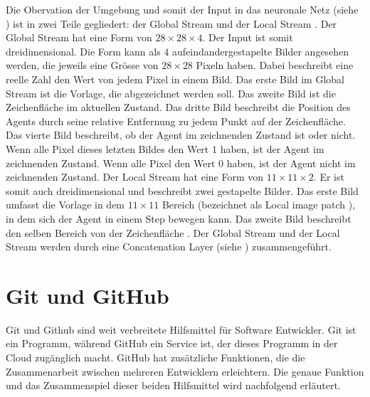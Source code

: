 Die Obervation der Umgebung und somit der Input in das neuronale Netz (siehe
) ist in zwei Teile gegliedert: der Global Stream und
der Local Stream \cite[S. 4]{zhou_learning_2018}. Der Global Stream hat eine
Form von $28\times28\times4$. Der Input ist somit dreidimensional. Die Form kann
als $4$ aufeindandergestapelte Bilder angesehen werden, die jeweils eine Grösse
von $28\times28$ Pixeln haben. Dabei beschreibt eine reelle Zahl den Wert von
jedem Pixel in einem Bild. Das erste Bild im Global Stream ist die Vorlage, die
abgezeichnet werden soll. Das zweite Bild ist die Zeichenfläche im aktuellen
Zustand. Das dritte Bild beschreibt die Position des Agents durch seine relative
Entfernung zu jedem Punkt auf der Zeichenfläche. Das vierte Bild beschreibt, ob
der Agent im zeichnenden Zustand ist oder nicht. Wenn alle Pixel dieses letzten
Bildes den Wert $1$ haben, ist der Agent im zeichnenden Zustand. Wenn alle Pixel
den Wert $0$ haben, ist der Agent nicht im zeichnenden Zustand. Der Local Stream
hat eine Form von $11\times11\times2$. Er ist somit auch dreidimensional und
beschreibt zwei gestapelte Bilder. Das erste Bild umfasst die Vorlage in dem
$11\times11$ Bereich (bezeichnet als Local image patch \cite[S.
5]{zhou_learning_2018}), in dem sich der Agent in einem Step bewegen kann. Das
zweite Bild beschreibt den selben Bereich von der Zeichenfläche \cite[S. 4
ff.]{zhou_learning_2018}. Der Global Stream und der Local Stream werden durch
eine Concatenation Layer (siehe ) zusammengeführt. 

\section{Git und GitHub}\label{chap:t_git} Git und Github sind weit verbreitete
Hilfsmittel für Software Entwickler. Git ist ein Programm, während GitHub ein
Service ist, der dieses Programm in der Cloud zugänglich macht. GitHub hat
zusätzliche Funktionen, die die Zusammenarbeit zwischen mehreren Entwicklern
erleichtern. Die genaue Funktion und das Zusammenspiel dieser beiden Hilfsmittel
wird nachfolgend erläutert.

